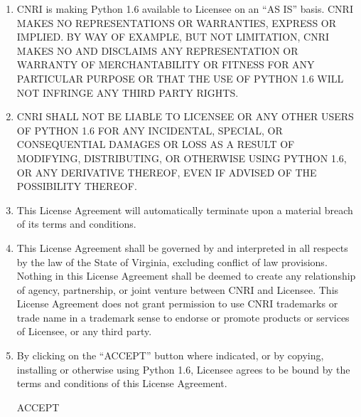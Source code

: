 \begin{enumerate}
\item
CNRI is making Python 1.6 available to Licensee on an ``AS IS''
basis.  CNRI MAKES NO REPRESENTATIONS OR WARRANTIES, EXPRESS OR
IMPLIED.  BY WAY OF EXAMPLE, BUT NOT LIMITATION, CNRI MAKES NO AND
DISCLAIMS ANY REPRESENTATION OR WARRANTY OF MERCHANTABILITY OR FITNESS
FOR ANY PARTICULAR PURPOSE OR THAT THE USE OF PYTHON 1.6 WILL NOT
INFRINGE ANY THIRD PARTY RIGHTS.

\item
CNRI SHALL NOT BE LIABLE TO LICENSEE OR ANY OTHER USERS OF PYTHON
1.6 FOR ANY INCIDENTAL, SPECIAL, OR CONSEQUENTIAL DAMAGES OR LOSS AS A
RESULT OF MODIFYING, DISTRIBUTING, OR OTHERWISE USING PYTHON 1.6, OR
ANY DERIVATIVE THEREOF, EVEN IF ADVISED OF THE POSSIBILITY THEREOF.

\item
This License Agreement will automatically terminate upon a material
breach of its terms and conditions.

\item
This License Agreement shall be governed by and interpreted in all
respects by the law of the State of Virginia, excluding conflict of
law provisions.  Nothing in this License Agreement shall be deemed to
create any relationship of agency, partnership, or joint venture
between CNRI and Licensee.  This License Agreement does not grant
permission to use CNRI trademarks or trade name in a trademark sense
to endorse or promote products or services of Licensee, or any third
party.

\item
By clicking on the ``ACCEPT'' button where indicated, or by copying,
installing or otherwise using Python 1.6, Licensee agrees to be bound
by the terms and conditions of this License Agreement.

\centerline{ACCEPT}
\end{enumerate}
